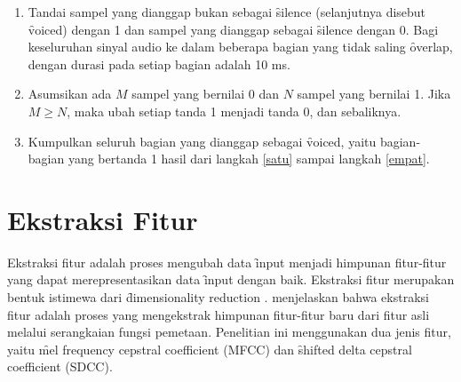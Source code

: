 \begin{enumerate}
	\item Tandai sampel yang dianggap bukan sebagai \f{silence} (selanjutnya disebut \f{voiced}) dengan 1 dan sampel yang dianggap sebagai \f{silence} dengan 0. Bagi keseluruhan sinyal audio ke dalam beberapa bagian yang tidak saling \f{overlap}, dengan durasi pada setiap bagian adalah 10 ms.

	\item \label{empat} Asumsikan ada $M$ sampel yang bernilai 0 dan $N$ sampel yang bernilai 1. Jika $M \geq N$, maka ubah setiap tanda 1 menjadi tanda 0, dan sebaliknya.

	\item Kumpulkan seluruh bagian yang dianggap sebagai \f{voiced}, yaitu bagian-bagian yang bertanda 1 hasil dari langkah \ref{satu} sampai langkah \ref{empat}.
\end{enumerate}


	
\section{Ekstraksi Fitur} \label{chap:ekstraksi fitur}
Ekstraksi fitur adalah proses mengubah data \f{input} menjadi himpunan fitur-fitur yang dapat merepresentasikan data \f{input} dengan baik. Ekstraksi fitur merupakan bentuk istimewa dari \f{dimensionality reduction} \citep{Soft-Computational}. \cite{wyse1980critical} menjelaskan bahwa ekstraksi fitur adalah proses yang mengekstrak himpunan fitur-fitur baru dari fitur asli melalui serangkaian fungsi pemetaan. Penelitian ini menggunakan dua jenis fitur, yaitu \f{mel frequency cepstral coefficient} (MFCC) dan \f{shifted delta cepstral coefficient} (SDCC).


